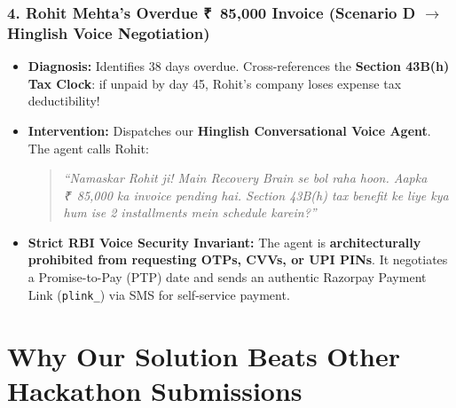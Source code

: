 \documentclass[11pt, a4paper]{article}
\newcommand{\INR}{{\rupeefont ₹}}
\begin{document}
\subsubsection{4. Rohit Mehta's Overdue \INR~85,000 Invoice (Scenario D $\rightarrow$ Hinglish Voice Negotiation)}
\begin{itemize}[leftmargin=1.5em, itemsep=2pt]
  \item \textbf{Diagnosis:} Identifies 38 days overdue. Cross-references the \textbf{Section 43B(h) Tax Clock}: if unpaid by day 45, Rohit's company loses expense tax deductibility!
  \item \textbf{Intervention:} Dispatches our \textbf{Hinglish Conversational Voice Agent}. The agent calls Rohit:
  \begin{quote}
  \textit{``Namaskar Rohit ji! Main Recovery Brain se bol raha hoon. Aapka \INR~85,000 ka invoice pending hai. Section 43B(h) tax benefit ke liye kya hum ise 2 installments mein schedule karein?''}
  \end{quote}
  \item \textbf{Strict RBI Voice Security Invariant:} The agent is \textbf{architecturally prohibited from requesting OTPs, CVVs, or UPI PINs}. It negotiates a Promise-to-Pay (PTP) date and sends an authentic Razorpay Payment Link (\texttt{plink\_}) via SMS for self-service payment.
\end{itemize}

\newpage
\section{Why Our Solution Beats Other Hackathon Submissions}
\end{document}
